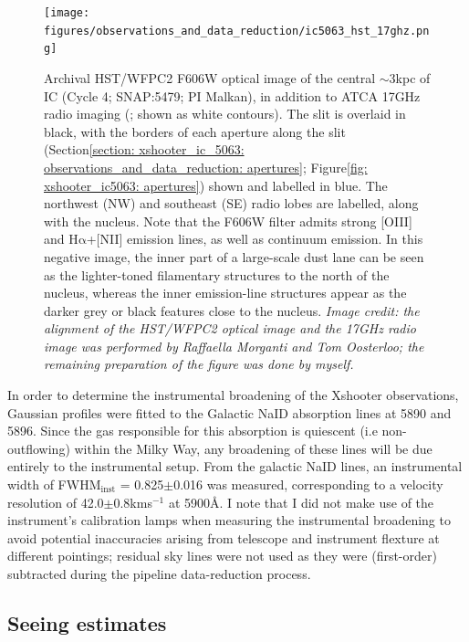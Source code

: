 \begin{figure}
    \texttt{[image: figures/observations\_and\_data\_reduction/ic5063\_hst\_17ghz.png]}
    \caption[VLT/Xshooter slit position used for the observations the Seyfert galaxy IC, overlaid on optical and 17\;GHz radio continuum imaging.]{Archival HST/WFPC2 F606W optical image of the central $\sim$3\;kpc of IC (Cycle 4; SNAP:5479; PI Malkan), in addition to ATCA 17\;GHz radio imaging (\citealt{Morganti2007}; shown as white contours). The slit is overlaid in black, with the borders of each aperture along the slit (Section\;\ref{section: xshooter_ic_5063: observations_and_data_reduction: apertures}; Figure\;\ref{fig: xshooter_ic5063: apertures}) shown and labelled in blue. The northwest (NW) and southeast (SE) radio lobes are labelled, along with the nucleus. Note that the F606W filter admits strong [OIII] and H$\mathrm{\alpha}$+[NII] emission lines, as well as continuum emission. In this negative image, the inner part of a large-scale dust lane can be seen as the lighter-toned filamentary structures to the north of the nucleus, whereas the inner emission-line structures appear as the darker grey or black features close to the nucleus. \textit{Image credit: the alignment of the HST/WFPC2 optical image and the 17\;GHz radio image was performed by Raffaella Morganti and Tom Oosterloo; the remaining preparation of the figure was done by myself.}}
    \label{fig: observations_and_data_reduction: xshooter_ic_5063: observations: ic5063_hst_17ghz}
\end{figure}

In order to determine the instrumental broadening of the Xshooter observations, Gaussian profiles were fitted to the Galactic NaID absorption lines at 5890\;{\AA} and 5896\;{\AA}. Since the gas responsible for this absorption is quiescent (i.e non-outflowing) within the Milky Way, any broadening of these lines will be due entirely to the instrumental setup. From the galactic NaID lines, an instrumental width of FWHM$_\mathrm{inst}$ = 0.825$\pm$0.016\;{\AA} was measured, corresponding to a velocity resolution of 42.0$\pm$0.8\;km\;s$^{-1}$ at 5900\;\AA. I note that I did not make use of the instrument's calibration lamps when measuring the instrumental broadening to avoid potential inaccuracies arising from telescope and instrument flexture at different pointings; residual sky lines were not used as they were (first-order) subtracted during the pipeline data-reduction process.

\subsection{Seeing estimates}
\label{section: xshooter_ic_5063: observations_and_data_reduction: seeing}

